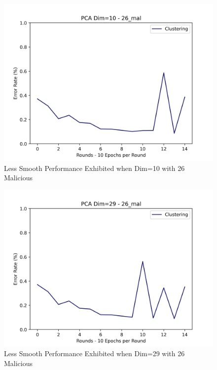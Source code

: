 \begin{figure}[htbp]
	\centering
    \includegraphics[scale=0.5]{my_agg/graphs/dim10_26mal.png}
	\caption{Less Smooth Performance Exhibited when Dim=10 with 26 Malicious}
	\label{fig:dim10_26mal}
\end{figure}

\begin{figure}[htbp]
	\centering
    \includegraphics[scale=0.5]{my_agg/graphs/dim29_26mal.png}
	\caption{Less Smooth Performance Exhibited when Dim=29 with 26 Malicious}
	\label{fig:dim29_26mal}
\end{figure}

